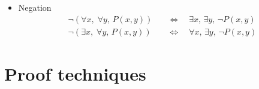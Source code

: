 \documentclass[11pt,twoside]{report}
\begin{document}
\begin{itemize}
\item Negation 
\begin{align*}
\neg ( \forall x ,\;  \forall y ,\,  P(x,y))  \quad & \iff   \quad \exists x,\, \exists y, \,  \neg P(x,y) \\
\neg ( \exists  x,\;  \forall y,\,  P(x,y)) \quad & \iff  \quad  \forall x, \, \exists y, \,  \neg P(x,y)
\end{align*}





  \end{itemize}
  
  
\section{Proof techniques}  
\end{document}
